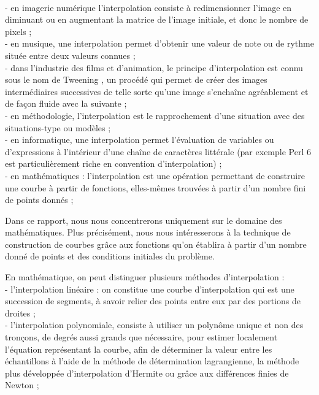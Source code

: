 \documentclass{article}
\begin{document}
\\
- en imagerie num\'{e}rique l'interpolation consiste \`{a} redimensionner l'image en diminuant ou en
augmentant la matrice de l'image initiale, et donc le nombre de pixels ;
\\
- en musique, une interpolation permet d'obtenir une valeur de note ou de rythme situ\'{e}e entre deux
valeurs connues ;
\\
- dans l'industrie des films et d'animation, le principe d'interpolation est connu sous le nom de \guillemotleft Tweening \guillemotright, un proc\'{e}d\'{e} qui permet de cr\'{e}er des images interm\'{e}diaires successives de telle sorte qu'une image s'encha\^{i}ne agr\'{e}ablement et de fa\c con fluide avec la suivante ;
\\
- en m\'{e}thodologie, l'interpolation est le rapprochement d'une situation avec des situations-type ou
mod\`{e}les ;
\\
- en informatique, une interpolation permet l'\'{e}valuation de variables ou d'expressions \`{a} l'int\'{e}rieur
d'une cha\^{i}ne de caract\`{e}res litt\'{e}rale (par exemple Perl 6 est particuli\`{e}rement riche en convention
d'interpolation) ;
\\
- en math\'{e}matiques : l'interpolation est une op\'{e}ration permettant de construire une courbe \`{a} partir de fonctions, elles-m\^{e}mes trouv\'{e}es \`{a} partir d'un nombre fini de points donn\'{e}s ;
\par
Dans ce rapport, nous nous concentrerons uniquement sur le domaine des math\'{e}matiques. Plus pr\'{e}cis\'{e}ment, nous nous int\'{e}resserons \`{a} la technique de construction de courbes gr\^{a}ce aux fonctions qu'on \'{e}tablira \`{a} partir d'un nombre donn\'{e} de points et des conditions initiales du probl\`{e}me.
\par
	En math\'{e}matique, on peut distinguer plusieurs m\'{e}thodes d'interpolation :
\\
- l'interpolation lin\'{e}aire : on constitue une courbe d'interpolation qui est une succession de segments, \`{a} savoir relier des points entre eux par des portions de droites ;
\\
- l'interpolation polynomiale, consiste \`{a} utiliser un polyn\^{o}me unique et non des tron\c cons, de degr\'{e}s aussi grands que n\'{e}cessaire, pour estimer localement l'\'{e}quation repr\'{e}sentant la courbe, afin de d\'{e}terminer la valeur entre les \'{e}chantillons \`{a} l'aide de la m\'{e}thode de d\'{e}termination lagrangienne, la m\'{e}thode plus d\'{e}velopp\'{e}e d'interpolation d'Hermite ou gr\^{a}ce aux diff\'{e}rences finies de Newton ;
\end{document}
